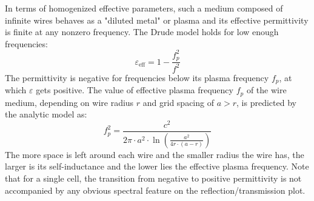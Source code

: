 {In terms of homogenized effective parameters, such a medium composed of infinite wires behaves as a "diluted metal" or plasma and its effective permittivity is finite at any nonzero frequency. The Drude model holds for low enough frequencies:
\begin{equation} \varepsilon_{\text{eff}} = 1 - \frac{f_{p}^{2}}{f^{2}} \label{eq_metaleps}\end{equation}
The permittivity is negative for frequencies below its plasma frequency $f_p$, at which $\varepsilon$ gets positive. The value of effective plasma frequency $f_p$ of the wire medium, depending on wire radius $r$ and grid spacing of $a>r$, is predicted by the analytic model\cite{maslovski2002wire} as:
\begin{equation} f_{p}^{2} = \frac{c^{2}}{2\pi \cdot a^{2} \cdot \ln\left(\frac{a^{2}}{4r \cdot (a-r)}\right)} \label{eq_fp_maslovski}\end{equation}
The more space is left around each wire and the smaller radius the wire has, the larger is its self-inductance and the lower lies the effective plasma frequency. 
Note that for a single cell, the transition from negative to positive permittivity is not accompanied by any obvious spectral feature on the reflection/transmission plot. 

}
